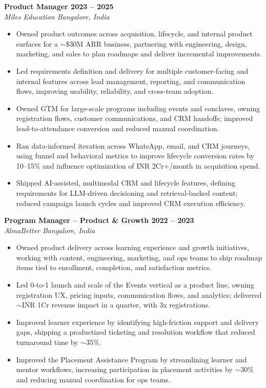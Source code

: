 \documentclass[10pt,a4paper]{article}
\begin{document}
\textbf{Product Manager \textbar{} 2023 -- 2025} \\
\textit{Miles Education \textbar{} Bangalore, India}
\begin{itemize}
  \item Owned product outcomes across acquisition, lifecycle, and internal product surfaces for a $\sim$\$30M ARR business, partnering with engineering, design, marketing, and sales to plan roadmaps and deliver incremental improvements.
  \item Led requirements definition and delivery for multiple customer-facing and internal features across lead management, reporting, and communication flows, improving usability, reliability, and cross-team adoption.
  \item Owned GTM for large-scale programs including events and conclaves, owning registration flows, customer communications, and CRM handoffs; improved lead-to-attendance conversion and reduced manual coordination.
  \item Ran data-informed iteration across WhatsApp, email, and CRM journeys, using funnel and behavioral metrics to improve lifecycle conversion rates by 10--15\% and influence optimization of INR 2Cr+/month in acquisition spend.
  \item Shipped AI-assisted, multimodal CRM and lifecycle features, defining requirements for LLM-driven decisioning and retrieval-backed content; reduced campaign launch cycles and improved CRM execution efficiency.
\end{itemize}

\textbf{Program Manager -- Product \& Growth \textbar{} 2022 -- 2023} \\
\textit{AlmaBetter \textbar{} Bangalore, India}
\begin{itemize}
  \item Owned product delivery across learning experience and growth initiatives, working with content, engineering, marketing, and ops teams to ship roadmap items tied to enrollment, completion, and satisfaction metrics.
  \item Led 0-to-1 launch and scale of the Events vertical as a product line, owning registration UX, pricing inputs, communication flows, and analytics; delivered $\sim$INR 1Cr revenue impact in a quarter, with 3x registrations.
  \item Improved learner experience by identifying high-friction support and delivery gaps, shipping a productized ticketing and resolution workflow that reduced turnaround time by $\sim$35\%.
  \item Improved the Placement Assistance Program by streamlining learner and mentor workflows, increasing participation in placement activities by $\sim$30\% and reducing manual coordination for ops teams.
\end{itemize}
\end{document}
